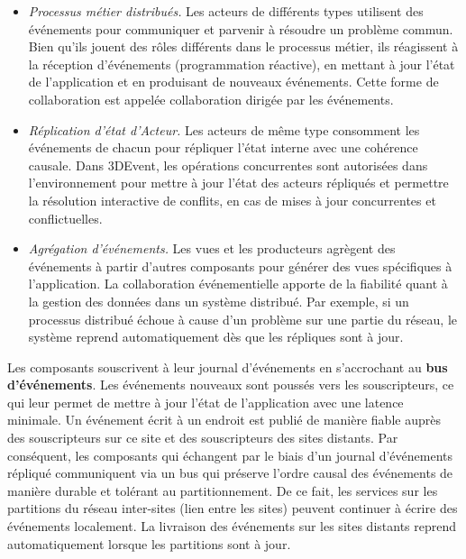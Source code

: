 \begin{itemize}
	\item \textit{Processus métier distribués.} Les acteurs de différents types 
	utilisent des événements pour communiquer et parvenir à résoudre un problème 
	commun. Bien qu'ils jouent des rôles différents dans le processus métier, ils 
	réagissent à la réception d'événements (programmation réactive), en 
	mettant à jour l'état de l'application et en produisant de nouveaux événements. 
	Cette forme de collaboration est appelée collaboration dirigée par les 
	événements.
	\item\textit{Réplication d'état d'Acteur.} Les acteurs de même type consomment 
	les événements de chacun pour répliquer l'état interne avec une cohérence 
	causale. Dans 3DEvent, les opérations concurrentes sont autorisées dans 
	l'environnement pour mettre à jour l'état des acteurs répliqués et permettre la 
	résolution interactive de conflits, en cas de mises à jour concurrentes et 
	conflictuelles. 
	\item \textit{Agrégation d'événements.} Les vues et les producteurs agrègent des 
	événements à partir d'autres composants pour générer des vues spécifiques à 
	l'application.
	La collaboration événementielle apporte de la fiabilité quant à la gestion des 
	données dans un système distribué. Par exemple, si un processus distribué 
	échoue à cause d'un problème sur une partie du réseau, le système reprend 
	automatiquement dès que les répliques sont à jour.
\end{itemize}

Les composants souscrivent à leur journal d'événements en s'accrochant au 
\textbf{bus d'événements}.
Les événements nouveaux sont poussés vers les souscripteurs, 
ce qui leur permet de mettre à jour l'état de l'application avec une latence 
minimale. 
Un événement écrit à un endroit est publié de manière fiable auprès des souscripteurs sur 
ce site et des souscripteurs des sites distants. 
Par conséquent, les composants qui échangent par le biais d'un 
journal d'événements répliqué communiquent via un bus qui préserve l'ordre causal 
des événements de manière durable et tolérant au partitionnement. De ce fait, les 
services sur les partitions du réseau inter-sites (lien entre les sites) peuvent 
continuer à écrire des événements localement. La livraison des événements sur 
les sites distants reprend automatiquement lorsque les partitions sont à jour.



